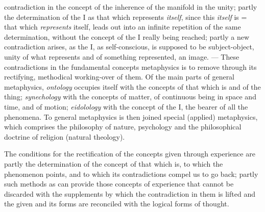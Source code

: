 contradiction in the concept of the inherence of the manifold in the
unity; partly the determination of the I as that which represents
\emph{itself}, since this \emph{itself} is = that which
\emph{represents} itself, leads out into an infinite repetition of the
same determination, without the concept of the I really being reached;
partly a new contradiction arises, as the I, as self-conscious, is
supposed to be subject-object, unity of what represents and of something
represented, an image. --- These contradictions in the fundamental
concepts metaphysics is to remove through its rectifying, methodical
working-over of them. Of the main parts of general metaphysics,
\emph{ontology} occupies itself with the concepts of that which is and of
the thing; \emph{synechology} with the concepts of matter, of continuous
being in space and time, and of motion; \emph{eidolology} with the
concept of the I, the bearer of all the phenomena. To general metaphysics
is then joined special (applied) metaphysics, which comprises the
philosophy of nature, psychology and the philosophical doctrine of
religion (natural theology).

The conditions for the rectification of the concepts given through
experience are partly the determination of the concept of that which is,
to which the phenomenon points, and to which its contradictions compel us
to go back; partly such methods as can provide those concepts of
experience that cannot be discarded with the supplements by which the
contradiction in them is lifted and the given and its forms are
reconciled with the logical forms of thought.

